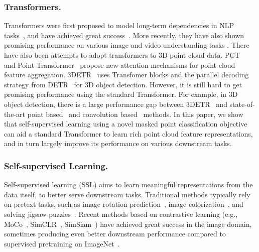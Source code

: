 \documentclass[runningheads]{llncs}
\begin{document}
\subsubsection{Transformers.} 
Transformers were first proposed to model long-term dependencies in NLP tasks~\cite{NIPS2017_3f5ee243}, and have achieved great success~\cite{NIPS2017_3f5ee243,devlin-etal-2019-bert,Radford2018-GPT}. More recently, they have also shown promising performance on various image and video understanding tasks \cite{dosovitskiy2020vit,tolstikhin2021mixer,steiner2021augreg,carion2020end,max_deeplab_2021,jiang2021transgan,radford2021learning}. There have also been attempts to adopt transformers to 3D point cloud data. PCT~\cite{guo2021pct} and Point Transformer~\cite{zhao2021point} propose new attention mechanisms for point cloud feature aggregation. 3DETR~\cite{misra2021-3detr} uses Transfomer blocks and the parallel decoding strategy from DETR~\cite{carion2020end} for 3D object detection.  However, it is still hard to get promising performance using the standard Transformer. For example, in 3D object detection, there is a large performance gap between 3DETR~\cite{misra2021-3detr} and state-of-the-art point based~\cite{zhang2020h3dnet} and convolution based~\cite{rukhovich2021fcaf3d} methods. In this paper, we show that self-supervised learning using a novel masked point classification objective can aid a standard Transformer to learn rich point cloud feature representations, and in turn largely improve its performance on various downstream tasks.

\vspace{-10pt}
\subsubsection{Self-supervised Learning.}
Self-supervised learning  (SSL) aims to learn meaningful representations from the data itself, to better serve downstream tasks. Traditional methods typically rely on pretext tasks, such as image rotation
prediction~\cite{gidaris2018unsupervised}, image colorization~\cite{zhang2016colorful}, and solving jigsaw puzzles~\cite{noroozi2016unsupervised}.  Recent methods based on contrastive learning (e.g., MoCo~\cite{he2020momentum}, SimCLR~\cite{pmlr-v119-chen20j}, SimSiam~\cite{chen2021exploring}) have achieved great success in the image domain, sometimes producing even better downstream performance compared to  supervised pretraining on ImageNet~\cite{deng2009imagenet}.
\end{document}
